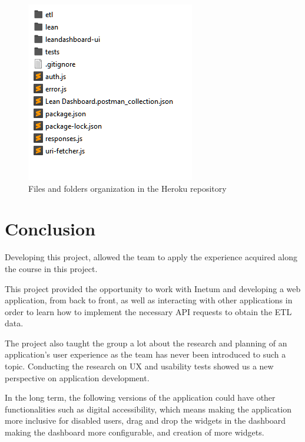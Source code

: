 \documentclass[a4paper,twoside,10pt]{report}
\begin{document}
\begin{figure}[h!]
\center
  \includegraphics[width=\textwidth]{deploymentFolder.png}
\caption{Files and folders organization in the Heroku repository}
\end{figure}



\chapter{Conclusion}

Developing this project, allowed the team to apply the experience acquired along the course in this project.

This project provided the opportunity to work with Inetum and developing a web application, from back to front, as well as interacting with other applications in order to learn how to implement the necessary API requests to obtain the ETL data.

The project also taught the group a lot about the research and planning of an application's user experience as the team has never been introduced to such a topic. Conducting the research on UX and usability tests showed us a new perspective on application development.

In the long term, the following versions of the application could have other functionalities such as digital accessibility, which means making the application more inclusive for disabled users, drag and drop the widgets in the dashboard making the dashboard more configurable, and creation of more widgets.
\end{document}
